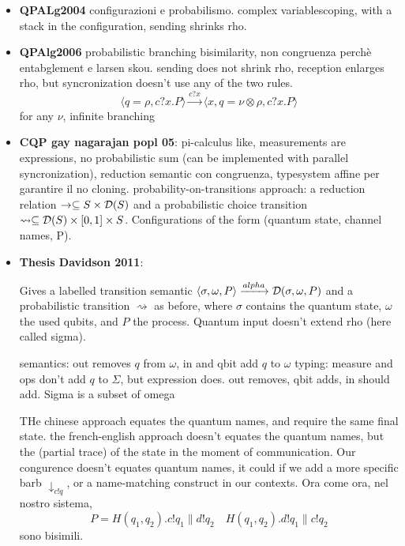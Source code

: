  


\begin{itemize}
\item \textbf{QPALg2004} configurazioni e probabilismo. complex variablescoping, with a stack in the configuration, sending shrinks rho. 

\item \textbf{QPAlg2006} probabilistic branching bisimilarity, non congruenza perchè entabglement e larsen skou. sending does not shrink rho, reception enlarges rho, but syncronization doesn't use any of the two rules. 
\[ \langle q = \rho, c?x.P \rangle \xrightarrow{c?x} \langle x,q = \nu\otimes\rho, c?x.P \rangle
\]
for any $\nu$, infinite branching


\item \textbf{CQP gay nagarajan popl 05}: pi-calculus like, measurements are expressions, no probabilistic sum (can be implemented with parallel syncronization), reduction semantic con congruenza, typesystem affine per garantire il no cloning. probability-on-transitions approach: a reduction relation $\rightarrow \subseteq S \times \mathcal{D}(S)$ and a probabilistic choice transition $\rightsquigarrow \subseteq \mathcal{D}(S)\times [0, 1] \times S$. Configurations of the form (quantum state, channel names, P).

\item \textbf{Thesis Davidson 2011}:

Gives a labelled transition semantic $\langle \sigma, \omega, P\rangle \xrightarrow{alpha} \mathcal{D}(\sigma, \omega, P)$ and a probabilistic transition  $\rightsquigarrow$ as before, where $\sigma$ contains the quantum state, $\omega$ the used qubits, and $P$ the process. Quantum input doesn't extend rho (here called sigma).

semantics: out removes $q$ from $\omega$, in and qbit add $q$ to $\omega$ 
typing: measure and ops don't add $q$ to $\Sigma$, but expression does. out removes, qbit adds, in should add. 
Sigma is a subset of omega

THe chinese approach equates the quantum names, and require the same final state.
the french-english approach doesn't equates the quantum names, but the (partial trace) of the state in the moment of communication.
Our congurence doesn't equates quantum names, it could if we add a more specific barb $\downarrow_{c!q}$, or a name-matching construct in our contexts. 
Ora come ora, nel nostro sistema, 
\[ P = H(q_1, q_2).c!q_1 \parallel d!q_2 \quad H(q_1, q_2).d!q_1 \parallel c!q_2\]
sono bisimili.


\end{itemize}
